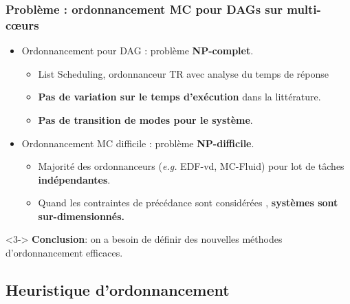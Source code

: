 \documentclass[xcolor=table]{beamer}
\begin{document}

\begin{frame}
	\frametitle{Problème : ordonnancement MC pour DAGs sur multi-c\oe{}urs}
	\centering
	\begin{itemize}
		\item Ordonnancement pour DAG : problème \textbf{NP-complet}.
		\begin{itemize}
			\item List Scheduling, ordonnanceur TR avec analyse du temps de réponse
			\item \textbf{Pas de variation sur le temps d'exécution} dans la littérature.
			\item \textbf{Pas de transition de modes pour le système}.
		\end{itemize}
		\item<2-> Ordonnancement MC difficile : problème \textbf{NP-difficile}.
		\begin{itemize}
			\item<2-> Majorité des ordonnanceurs (\emph{e.g.} EDF-vd, MC-Fluid) pour lot de tâches 
			\textbf{indépendantes}.
			\item<2-> Quand les contraintes de précédance sont considérées , 
			\textbf{systèmes sont sur-dimensionnés.}
		\end{itemize}
		
	\end{itemize}
	
	\begin{block}{}<3->
		\textbf{Conclusion}: on a besoin de définir des nouvelles méthodes d'ordonnancement efficaces.
	\end{block}
	
\end{frame}

\subsection{Heuristique d'ordonnancement}
\end{document}
